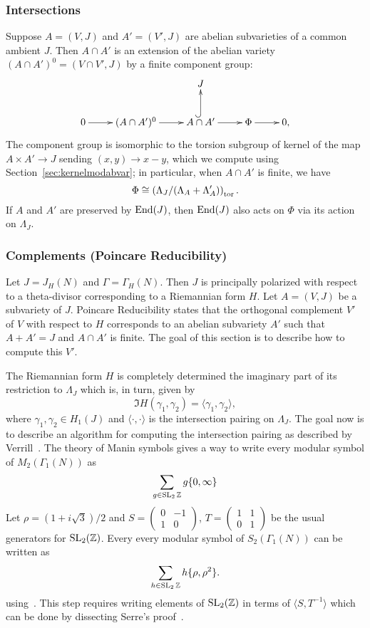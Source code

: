 \documentclass{article}
\begin{document}
\subsubsection{Intersections}
\label{sec:modabvar_intersections}

Suppose $A = (V,J)$ and $A' = (V', J)$ are abelian subvarieties of a
common ambient $J$.  Then $A\cap A'$ is an extension of the abelian
variety $(A\cap A')^0 = (V\cap V', J)$ by a finite component group:
$$
\xymatrix{
    & & J & & \\
    0\ar[r]& (A\cap A')^0 \ar[r]&  A\cap A'\ar@{^(->}[u] \ar[r]& \Phi\ar[r] & 0,
}
$$
The component group is isomorphic to the torsion subgroup of kernel of
the map $A \times A' \to J$ sending $(x,y)\to x-y$, which we compute
using Section~\ref{sec:kernelmodabvar}; in particular, when $A\cap A'$ is
finite, we have
$$
\Phi \cong \left( \Lambda_J/(\Lambda_A + \Lambda_A')\right)_{\operatorname{tor}}.
$$
If $A$ and $A'$ are preserved by $\operatorname{End}(J)$, then $\operatorname{End}(J)$ also
acts on $\Phi$ via its action on $\Lambda_J$.


\subsubsection{Complements (Poincare Reducibility)}
\label{sec:poincare}

Let $J=J_H(N)$ and $\Gamma=\Gamma_H(N)$. Then $J$ is principally polarized with
respect to a theta-divisor corresponding to a Riemannian form $H$. Let $A=(V,
J)$ be a subvariety of $J$. Poincare Reducibility states that the orthogonal
complement $V'$ of $V$ with respect to $H$ corresponds to an abelian subvariety
$A'$ such that $A+A'=J$ and $A\cap A'$ is finite. The goal of this section is
to describe how to compute this $V'$.

The Riemannian form $H$ is completely determined the imaginary part of its
restriction to $\Lambda_J$ which is, in turn, given by
\[
    \Im H(\gamma_1, \gamma_2) = \langle \gamma_1, \gamma_2 \rangle,
\]
where $\gamma_1, \gamma_2\in H_1(J)$ and $\langle \cdot,\cdot \rangle$ is the
intersection pairing on $\Lambda_J$. The goal now is to describe an algorithm
for computing the intersection pairing as described by Verrill~\cite[\S
4]{verrill:intersection}. The theory of Manin symbols gives a way to write
every modular symbol of $M_2(\Gamma_1(N))$ as
\[
    \sum_{g\in \operatorname{SL}_2{\mathbb{Z}}} g\{0, \infty\}
\]
Let $\rho=(1+i\sqrt{3})/2$ and
$S = \left(
    \begin{smallmatrix}
        0 & -1 \\
        1 & 0
    \end{smallmatrix}
\right)$,
$T = \left(
    \begin{smallmatrix}
        1 & 1 \\
        0 & 1
    \end{smallmatrix}
\right)$ be the usual generators for $\operatorname{SL}_2(\mathbb{Z})$.
Every every modular symbol of $S_2(\Gamma_1(N))$ can be written as
\[
    \sum_{h\in \operatorname{SL}_2{\mathbb{Z}}} h\{\rho, \rho^2\}.
\]
using~\cite[Corollary 4.1]{verrill:intersection}. This step requires writing
elements of $\operatorname{SL}_2(\mathbb{Z})$ in terms of $ \langle S, T^{-1} \rangle$ which can be
done by dissecting Serre's proof~\cite[Chapter 7, Theorem
2]{serre:course_arithmetic}.
\end{document}
